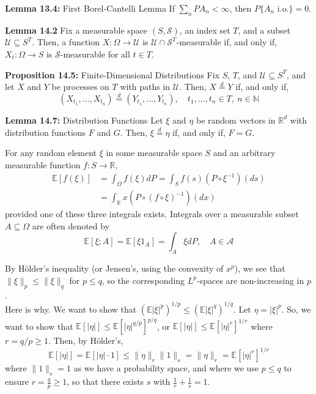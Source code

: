 \documentclass[10pt]{article}
\newenvironment{lemma}[1][]{\begin{theoremBox}{#1}}{\end{theoremBox}\vspace{4pt}}
\newcommand{\R}{\mathbb{R}}
\newcommand{\N}{\mathbb{N}}
\newcommand{\norm}[1]{\lVert {#1} \rVert}
\newcommand{\abs}[1]{\left\lvert {#1} \right\rvert}
\renewcommand{\cal}[1]{\mathcal{#1}}
\renewcommand{\tt}[1]{\text{#1}}
\let\cal\mathcal
\begin{document}
\begin{lemma}[\textbf{Lemma 13.4:} First Borel-Cantelli Lemma]
    If $\sum_{n} PA_n < \infty$, then $P\{A_n \tt{ i.o.}\} = 0$.
\end{lemma}

\begin{lemma}[\textbf{Lemma 14.2}]
    Fix a measurable space $(S, \cal{S})$, an index set $T$, and a subset $\cal{U} \subseteq S^{T}$. Then, a function $X : \Omega \to \cal{U}$ is $\cal{U} \cap \cal{S}^{T}$-measurable if, and only if, $X_t : \Omega \to S$ is $\cal{S}$-measurable for all $t \in T$.
\end{lemma}

\begin{lemma}[\textbf{Proposition 14.5:} Finite-Dimensional Distributions]
    Fix $S$, $T$, and $\cal{U} \subseteq S^{T}$, and let $X$ and $Y$ be processes on $T$ with paths in $\cal{U}$. Then, $X \overset{d}{=} Y$ if, and only if,
    \[ (X_{t_1}, \ldots, X_{t_n}) \overset{d}{=} (Y_{t_1}, \ldots, Y_{t_n}), \quad t_1, \ldots, t_n \in T,\ n \in \N \]
\end{lemma}

\begin{lemma}[\textbf{Lemma 14.7:} Distribution Functions]
    Let $\xi$ and $\eta$ be random vectors in $\R^{d}$ with distribution functions $F$ and $G$. Then, $\xi \overset{d}{=} \eta$ if, and only if, $F = G$.
\end{lemma}

For any random element $\xi$ in some measurable space $S$ and an arbitrary measurable function $f : S \to \R$,
\begin{align*}
    \mathbb{E}[f(\xi)] &= \int_{\Omega} f(\xi) dP = \int_{S} f(s)(P \circ \xi^{-1})(ds)\\
    &= \int_{\R} x (P \circ (f \circ \xi)^{-1})(dx)
\end{align*}
provided one of these three integrals exists. Integrals over a measurable subset $A \subseteq \Omega$ are often denoted by
\[ \mathbb{E}[\xi; A] = \mathbb{E}[\xi 1_{A}] = \int_{A} \xi dP, \quad A \in \cal{A} \]

By H\"older's inequality (or Jensen's, using the convexity of $x^{p}$), we see that $\norm{\xi}_{p} \leq \norm{\xi}_{q}$ for $p \leq q$, so the corresponding $L^{p}$-spaces are non-increasing in $p$.\\

Here is why. We want to show that $(\mathbb{E}\abs{\xi}^{p})^{1/p} \leq (\mathbb{E}\abs{\xi}^{q})^{1/q}$. Let $\eta = \abs{\xi}^{p}$. So, we want to show that $\mathbb{E}[\abs{\eta}] \leq \mathbb{E}[\abs{\eta}^{q/p}]^{p/q}$, or $\mathbb{E}[\abs{\eta}] \leq \mathbb{E}[\abs{\eta}^{r}]^{1/r}$ where $r = q/p \geq 1$. Then, by H\"older's,
\[ \mathbb{E}[\abs{\eta}] = \mathbb{E}[\abs{\eta} \cdot 1] \leq \norm{\eta}_{r}\norm{1}_{s} = \norm{\eta}_{r} = \mathbb{E}[\abs{\eta}^{r}]^{1/r} \]
where $\norm{1}_{s} = 1$ as we have a probability space, and where we use $p \leq q$ to ensure $r = \frac{q}{p} \geq 1$, so that there exists $s$ with $\frac{1}{r} + \frac{1}{s} = 1$.\\
\end{document}
